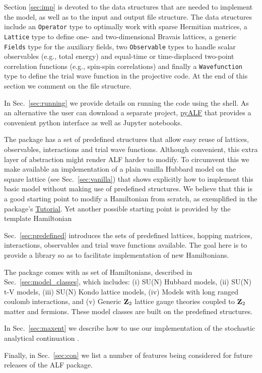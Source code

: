 Section \ref{sec:imp} is devoted to the data structures that are needed to implement the model, as well as to the input and output file structure.   
The data structures include an \texttt{Operator} type to optimally work with sparse Hermitian matrices,
a \texttt{Lattice} type  to define one- and two-dimensional Bravais lattices,
a generic \texttt{Fields} type for the auxiliary fields,
two \texttt{Observable} types to handle scalar observables (e.g., total energy) and equal-time or time-displaced two-point correlation functions (e.g., spin-spin correlations) and finally a \texttt{Wavefunction} type  to define the trial wave function in the projective code.
At the end of this section we comment on the file structure.

In Sec.~\ref{sec:running}   we provide details on running the code  using the shell.  As an alternative the user can download a separate project, \href{https://git.physik.uni-wuerzburg.de/ALF/pyALF/-/tree/\pyALFbranch}{pyALF}   that provides a convenient python interface as well as  Jupyter  notebooks. 

The package has a set of predefined structures that allow easy reuse of lattices, observables, interactions and trial wave functions.   Although convenient, this extra layer of abstraction might 
render ALF harder to modify. To circumvent this we make available an implementation of a plain vanilla Hubbard model on the square lattice (see Sec.~\ref{sec:vanilla}) that shows explicitly how to implement this basic model without making use of predefined structures.  We believe that this is a good starting point to modify a Hamiltonian from scratch, as exemplified in the package's \href{https://git.physik.uni-wuerzburg.de/ALF/ALF_Tutorial/-/blob/master/Tutorial-ALF-\tutALFver/}{Tutorial}. Yet another possible starting point is provided by the template Hamiltonian 

Sec.~\ref{sec:predefined}   introduces the sets of predefined lattices,  hopping matrices,  interactions, observables and trial wave functions available.  The goal here is to provide a 
library  so as to facilitate  implementation of new  Hamiltonians. 

The package comes with as set of Hamiltonians, described in Sec.~\ref{sec:model_classes}, which includes: (i) SU(N) Hubbard models, (ii) SU(N) t-V models, (iii) SU(N) Kondo lattice models, (iv)    Models with long ranged coulomb interactions, and (v) Generic $\mathbf{Z}_{2}$ lattice gauge theories coupled to $\mathbf{Z}_{2}$ matter and fermions.  These model classes are built on the predefined structures. 

In Sec.~\ref{sec:maxent}  we  describe how to use our implementation of the stochastic analytical  continuation \cite{Sandvik98,Beach04a}.

Finally, in Sec.~\ref{sec:con} we list a number of features being considered for  future releases of the ALF package.
